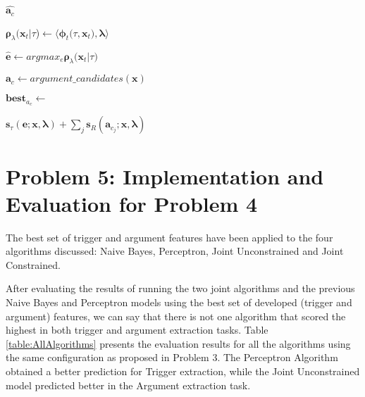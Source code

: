 \documentclass{article} %
\begin{document}
\begin{center}
\begin{algorithm}[!htp]
{            \KwRet $\widehat{\textbf{a}_c}$\;
        }{}
        
        
        $\boldsymbol{\rho}_\lambda(\textbf{x}_t|$\textbf{$\tau$})$ \leftarrow \langle\boldsymbol{\phi}_t($\textbf{$\tau$}$, \textbf{x}_t), \boldsymbol{\lambda}\rangle$\;
    
        $\widehat{\textbf{e}} \leftarrow argmax_e\boldsymbol{\rho}_\lambda(\textbf{x}_t|$\textbf{$\tau$}$)$\;
    
        
        $\textbf{a}_c \leftarrow argument\_candidates(\textbf{x})$\;
        
        $\textbf{best}_{a_c} \leftarrow$ \;
        
        \KwRet $\textbf{s}_\tau(\textbf{e}; \textbf{x}, \boldsymbol{\lambda}) + \sum_{j}\textbf{s}_R(\textbf{a}_{c_j}; \textbf{x}, \boldsymbol{\lambda})$\;
        
    
    \end{algorithm}
\end{center}

\section*{Problem 5: Implementation and Evaluation for Problem 4}

The best set of trigger and argument features have been applied to the four algorithms discussed: Naive Bayes, Perceptron, Joint Unconstrained and Joint Constrained.

After evaluating the results of running the two joint algorithms and the previous Naive Bayes and Perceptron models using the best set of developed (trigger and argument) features, we can say that there is not one algorithm that scored the highest in both trigger and argument extraction tasks. Table \ref{table:AllAlgorithms} presents the evaluation results for all the algorithms using the same configuration as proposed in Problem 3. The Perceptron Algorithm obtained a better prediction for Trigger extraction, while the Joint Unconstrained model predicted better in the Argument extraction task.
\end{document}
